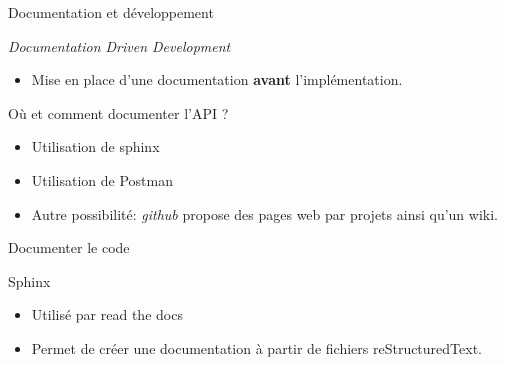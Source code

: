\begin{frame}{Documentation et développement}
  \begin{block}{\textit{Documentation Driven Development}}
    \begin{itemize}
    \item Mise en place d'une documentation \textbf{avant} l'implémentation.
    \end{itemize}
  \end{block}

  
  \begin{block}{Où et comment documenter l'API ?}
    \begin{itemize}
    \item Utilisation de \textsf{sphinx}
    \item Utilisation de \textsf{Postman}
    \item Autre possibilité: \textit{github} propose des pages web par projets ainsi qu'un wiki.
    \end{itemize}
  \end{block}  
\end{frame}

\begin{frame}{Documenter le code}
  \begin{block}{Sphinx}
    \begin{itemize}
    \item Utilisé par \textsf{read the docs}
    \item Permet de créer une documentation à partir de fichiers
      \textsf{reStructuredText}.
    \end{itemize}
  \end{block}  
\end{frame}

